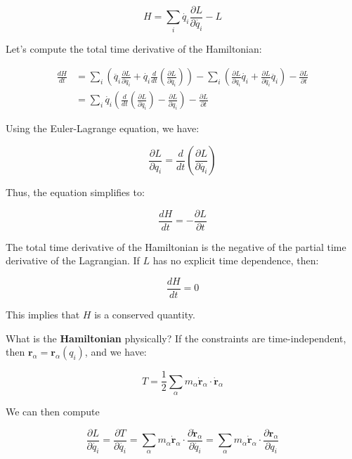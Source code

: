 \begin{equation}
    H=\sum_i \dot{q_i} \frac{\partial L}{\partial \dot{q_i}} - L
\end{equation}

Let's compute the total time derivative of the Hamiltonian:

\begin{align}
   \frac{dH}{dt}&=\sum_i \left(\ddot{q_i} \frac{\partial L}{\partial \dot{q_i}} + \dot{q_i} \frac{d}{dt} \left(\frac{\partial L}{\partial \dot{q_i}}\right)\right) - \sum_i \left(\frac{\partial L}{\partial q_i} \dot{q_i} + \frac{\partial L}{\partial \dot{q_i}} \ddot{q_i} \right) - \frac{\partial L}{\partial t}\\
   &=\sum_i\dot{q_i}\left(\frac{d}{dt} \left(\frac{\partial L}{\partial \dot{q_i}}\right)-\frac{\partial L}{\partial q_i}\right)-\frac{\partial L}{\partial t}
\end{align}

Using the Euler-Lagrange equation, we have:

\begin{equation}
    \frac{\partial L}{\partial q_i}=\frac{d}{dt} \left(\frac{\partial L}{\partial \dot{q_i}}\right)
\end{equation}

Thus, the equation simplifies to:

\begin{equation}
    \frac{dH}{dt}=-\frac{\partial L}{\partial t}
\end{equation}

The total time derivative of the Hamiltonian is the negative of the partial time 
derivative of the Lagrangian. If $L$ has no explicit time dependence, then:

\begin{equation}
    \frac{dH}{dt}=0
\end{equation}

This implies that $H$ is a conserved quantity.

What is the \textbf{Hamiltonian} physically? If the constraints are time-independent, then $\mathbf{r}_\alpha = \mathbf{r}_\alpha(q_i)$, and we have:

\begin{equation}
    T=\frac{1}{2} \sum_\alpha m_\alpha \dot{\mathbf{r}}_\alpha \cdot \dot{\mathbf{r}}_\alpha
\end{equation}

We can then compute

\begin{equation}
    \frac{\partial L}{\partial \dot{q_i}} = \frac{\partial T}{\partial \dot{q_i}} = \sum_\alpha m_\alpha \dot{\mathbf{r}}_\alpha \cdot \frac{\partial \dot{\mathbf{r}}_\alpha}{\partial \dot{q_i}} = \sum_\alpha m_\alpha \dot{\mathbf{r}}_\alpha \cdot \frac{\partial \mathbf{r}_\alpha}{\partial q_i}
\end{equation}

